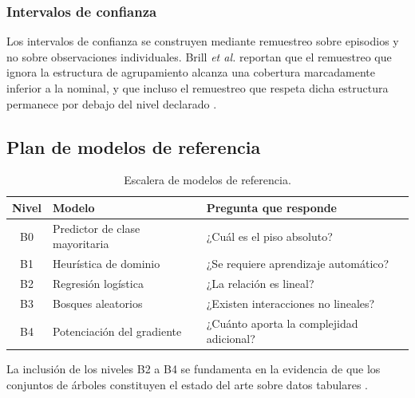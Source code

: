 
\subsubsection{Intervalos de confianza}

Los intervalos de confianza se construyen mediante remuestreo sobre
episodios y no sobre observaciones individuales. Brill \textit{et al.}
reportan que el remuestreo que ignora la estructura de agrupamiento alcanza
una cobertura marcadamente inferior a la nominal, y que incluso el
remuestreo que respeta dicha estructura permanece por debajo del nivel
declarado \cite{brill_winprob_2026}.


\subsection{Plan de modelos de referencia}
\label{subsec:planbaselines}

\begin{table}[!t]
\centering
\caption{Escalera de modelos de referencia.}
\label{tab:baselines}
\footnotesize
\begin{tabularx}{\columnwidth}{@{}c P{2.4cm} Y@{}}
\toprule
\textbf{Nivel} & \textbf{Modelo} & \textbf{Pregunta que responde}\\
\midrule
B0 & Predictor de clase mayoritaria & ¿Cuál es el piso absoluto?\\
B1 & Heurística de dominio & ¿Se requiere aprendizaje automático?\\
B2 & Regresión logística & ¿La relación es lineal?\\
B3 & Bosques aleatorios & ¿Existen interacciones no lineales?\\
B4 & Potenciación del gradiente & ¿Cuánto aporta la complejidad adicional?\\
\bottomrule
\end{tabularx}
\end{table}

La inclusión de los niveles B2 a B4 se fundamenta en la evidencia de que
los conjuntos de árboles constituyen el estado del arte sobre datos
tabulares \cite{borisov_tabular_2024, grinsztajn_trees_2022}.

